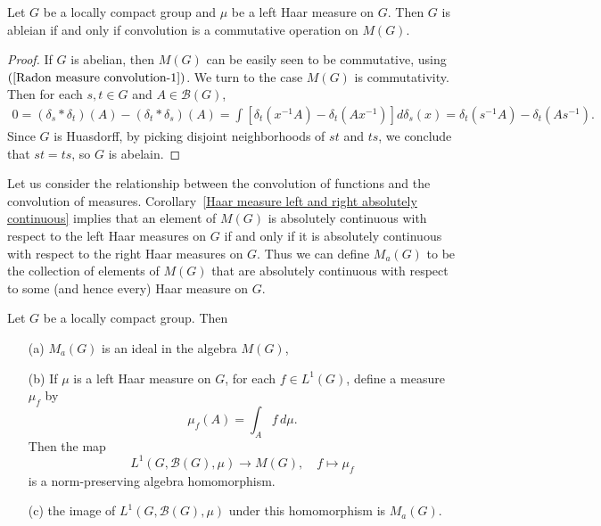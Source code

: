 \begin{proposition}\label{LCH group commutative M(G) iff}
Let $G$ be a locally compact group and $\mu$ be a left Haar measure on $G$. Then $G$ is ableian if and only if convolution is a commutative operation on $M(G)$.
\end{proposition}
\begin{proof}
If $G$ is abelian, then $M(G)$ can be easily seen to be commutative, using $(\ref{Radon measure convolution-1})$. We turn to the case $M(G)$ is commutativity. Then for each $s,t\in G$ and $A\in\mathcal{B}(G)$,
\begin{align*}
0=(\delta_s\ast\delta_t)(A)-(\delta_t\ast\delta_s)(A)=\int[\delta_t(x^{-1}A)-\delta_t(Ax^{-1})]d\delta_s(x)=\delta_t(s^{-1}A)-\delta_t(As^{-1}).
\end{align*}
Since $G$ is Huasdorff, by picking disjoint neighborhoods of $st$ and $ts$, we conclude that $st=ts$, so $G$ is abelain.
\end{proof}
Let us consider the relationship between the convolution of functions and the convolution of measures. Corollary~\ref{Haar measure left and right absolutely continuous} implies that an element of $M(G)$ is absolutely continuous with respect to the left Haar measures on $G$ if and only if it is absolutely continuous with respect to the right Haar measures on $G$. Thus we can define $M_a(G)$ to be the collection of elements of $M(G)$ that are absolutely continuous with respect to some (and hence every) Haar measure on $G$.
\begin{proposition}\label{LCH group embedd L^1(G) to M(G)}
Let $G$ be a locally compact group. Then
\begin{itemize}
\item[(a)] $M_a(G)$ is an ideal in the algebra $M(G)$,
\item[(b)] If $\mu$ is a left Haar measure on $G$, for each $f\in L^1(G)$, define a measure $\mu_f$ by
\[\mu_f(A)=\int_Af\,d\mu.\]
Then the map
\[L^1(G,\mathcal{B}(G),\mu)\to M(G),\quad f\mapsto \mu_f\]
is a norm-preserving algebra homomorphism.
\item[(c)] the image of $L^1(G,\mathcal{B}(G),\mu)$ under this homomorphism is $M_a(G)$.
\end{itemize}
\end{proposition}
